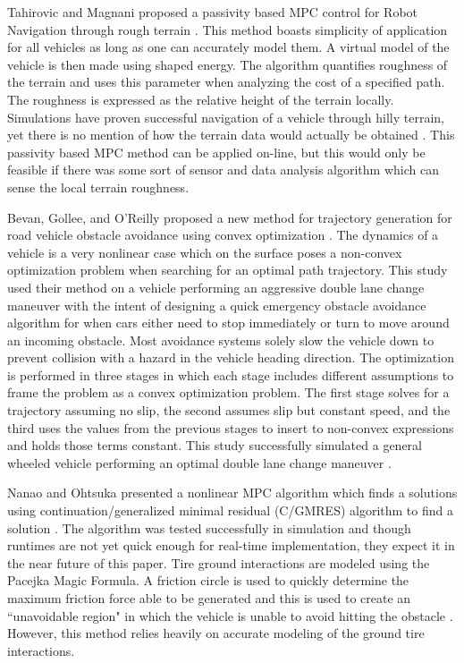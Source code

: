 \documentclass[12pt,onecolumn]{report}
\begin{document}
Tahirovic and Magnani proposed a passivity based MPC control for Robot Navigation through rough terrain \cite{Tahirovic&Magnani2010}. This method boasts simplicity of application for all vehicles as long as one can accurately model them. A virtual model of the vehicle is then made using shaped energy. The algorithm quantifies roughness of the terrain and uses this parameter when analyzing the cost of a specified path. The roughness is expressed as the relative height of the terrain locally. Simulations have proven successful navigation of a vehicle through hilly terrain, yet there is no mention of how the terrain data would actually be obtained \cite{Tahirovic&Magnani2010}. This passivity based MPC method can be applied on-line, but this would only be feasible if there was some sort of sensor and data analysis algorithm which can sense the local terrain roughness.

Bevan, Gollee, and O'Reilly proposed a new method for trajectory generation for road vehicle obstacle avoidance using convex optimization \cite{Bevan&Gollee2010}. The dynamics of a vehicle is a very nonlinear case which on the surface poses a non-convex optimization problem when searching for an optimal path trajectory. This study used their method on a vehicle performing an aggressive double lane change maneuver with the intent of designing a quick emergency obstacle avoidance algorithm for when cars either need to stop immediately or turn to move around an incoming obstacle. Most avoidance systems solely slow the vehicle down to prevent collision with a hazard in the vehicle heading direction. The optimization is performed in three stages in which each stage includes different assumptions to frame the problem as a convex optimization problem. The first stage solves for a trajectory assuming no slip, the second assumes slip but constant speed, and the third uses the values from the previous stages to insert to non-convex expressions and holds those terms constant. This study successfully simulated a general wheeled vehicle performing an optimal double lane change maneuver \cite{Bevan&Gollee2010}.

Nanao and Ohtsuka presented a nonlinear MPC algorithm which finds a solutions using continuation/generalized minimal residual (C/GMRES) algorithm to find a solution \cite{Nanao&Ohtsuka2010}. The algorithm was tested successfully in simulation and though runtimes are not yet quick enough for real-time implementation, they expect it in the near future of this paper. Tire ground interactions are modeled using the Pacejka Magic Formula. A friction circle is used to quickly determine the maximum friction force able to be generated and this is used to create an ``unavoidable region" in which the vehicle is unable to avoid hitting the obstacle \cite{Nanao&Ohtsuka2010}. However, this method relies heavily on accurate modeling of the ground tire interactions.
\end{document}
